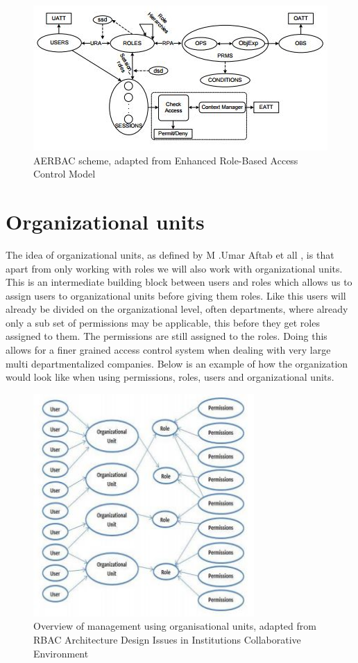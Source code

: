 \begin{figure}[ht]
    \centering
    \includegraphics[width=1\textwidth, height=0.45\textwidth]{Img/self/AERBAC.JPG}
    \caption{AERBAC scheme, adapted from Enhanced Role-Based Access Control Model\cite{Combined3}}
\end{figure}
\section{Organizational units}
The idea of organizational units, as defined by M .Umar Aftab et all \cite{OU}, is that apart from only working with roles we will also work with organizational units.
This is an intermediate building block between users and roles which allows us to assign users to organizational units before giving them roles.
Like this users will already be divided on the organizational level, often departments, where already only a sub set of permissions may be applicable, this before they get roles assigned to them.
The permissions are still assigned to the roles.
Doing this allows for a finer grained access control system when dealing with very large multi departmentalized companies.
Below is an example of how the organization would look like when using permissions, roles, users and organizational units.

\begin{figure}[h]
    \centering
    \includegraphics[width=0.75\textwidth, height=0.55\textwidth]{Img/self/OUExample.JPG}
    \caption{Overview of management using organisational units, adapted from RBAC Architecture Design Issues in Institutions Collaborative Environment \cite{OU}}
\end{figure}

